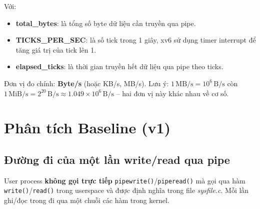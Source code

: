 \documentclass[12pt,a4paper]{article}
\newcommand{\code}[1]{\texttt{#1}}
\begin{document}
Với:
\begin{itemize}
    \item \textbf{total\_bytes}: là tổng số byte dữ liệu cần truyền qua pipe.
    \item \textbf{TICKS\_PER\_SEC}: là số tick trong 1 giây, xv6 sử dụng timer interrupt để tăng giá trị của tick lên 1.
    \item \textbf{elapsed\_ticks}: là thời gian truyền hết dữ liệu qua pipe theo ticks.
\end{itemize}
Đơn vị đo chính: \textbf{Byte/s} (hoặc KB/s, MB/s).
Lưu ý: $1\,\text{MB/s} = 10^6\,\text{B/s}$ còn
$1\,\text{MiB/s} = 2^{20}\,\text{B/s} \approx 1.049 \times 10^6\,\text{B/s}$
-- hai đơn vị này khác nhau về cơ số.

\section{Phân tích Baseline (v1)}
\label{sec:baseline}


\subsection{Đường đi của một lần write/read qua pipe}

User process \textbf{không gọi trực tiếp} \code{pipewrite()}/\code{piperead()} mà gọi qua hàm \code{write()}/\code{read()} trong userspace và được định nghĩa trong file \textit{sysfile.c}.
Mỗi lần ghi/đọc trong đi qua một chuỗi các hàm trong kernel.
\end{document}
